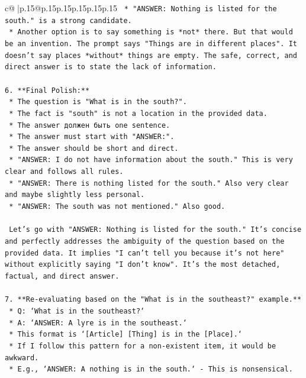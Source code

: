 \documentclass{article}
\begin{document}
{\begin{supertabular}{c@{$\;$}|p{.15\linewidth}@{}p{.15\linewidth}p{.15\linewidth}p{.15\linewidth}p{.15\linewidth}p{.15\linewidth}}
{{{\texttt{    *   "ANSWER: Nothing is listed for the south." is a strong candidate.} \\
\texttt{    *   Another option is to say something is *not* there. But that would be an invention. The prompt says "Things are in different places". It doesn't say places *without* things are empty. The safe, correct, and direct answer is to state the lack of information.} \\
\\ 
\texttt{6.  **Final Polish:**} \\
\texttt{    *   The question is "What is in the south?".} \\
\texttt{    *   The fact is "south" is not a location in the provided data.} \\
\texttt{    *   The answer должен быть one sentence.} \\
\texttt{    *   The answer must start with "ANSWER:".} \\
\texttt{    *   The answer should be short and direct.} \\
\texttt{    *   "ANSWER: I do not have information about the south." This is very clear and follows all rules.} \\
\texttt{    *   "ANSWER: There is nothing listed for the south." Also very clear and maybe slightly less personal.} \\
\texttt{    *   "ANSWER: The south was not mentioned." Also good.} \\
\\ 
\texttt{    Let's go with "ANSWER: Nothing is listed for the south." It's concise and perfectly addresses the ambiguity of the question based on the provided data. It implies "I can't tell you because it's not here" without explicitly saying "I don't know". It's the most detached, factual, and direct answer.} \\
\\ 
\texttt{7.  **Re{-}evaluating based on the "What is in the southeast?" example.**} \\
\texttt{    *   Q: `What is in the southeast?`} \\
\texttt{    *   A: `ANSWER: A lyre is in the southeast.`} \\
\texttt{    *   This format is `{[}Article{]} {[}Thing{]} is in the {[}Place{]}.`} \\
\texttt{    *   If I follow this pattern for a non{-}existent item, it would be awkward.} \\
\texttt{    *   E.g., `ANSWER: A nothing is in the south.` {-} This is nonsensical.} \\
}}}
\end{supertabular}}
\end{document}
